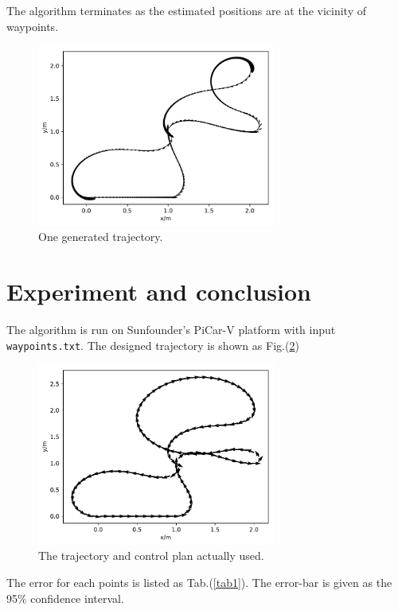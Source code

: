 \documentclass[12pt]{article}
\begin{document}
The algorithm terminates as the estimated positions are at the vicinity of waypoints.
\begin{figure}[htbp]
\centering
\includegraphics[width=0.7\textwidth]{../ideal_traj.pdf}
\caption{One generated trajectory.}\label{ideal}
\end{figure}
\section{Experiment and conclusion}
The algorithm is run on Sunfounder's PiCar-V platform with input \texttt{waypoints.txt}. The designed trajectory is shown as Fig.(\ref{act})

\begin{figure}[htbp]
\centering
\includegraphics[width=0.7\textwidth]{../acutal_used.pdf}
\caption{The trajectory and control plan actually used.}\label{act}
\end{figure}

The error for each points is listed as Tab.(\ref{tab1}). The error-bar is given as the  95\% confidence interval.
\end{document}
